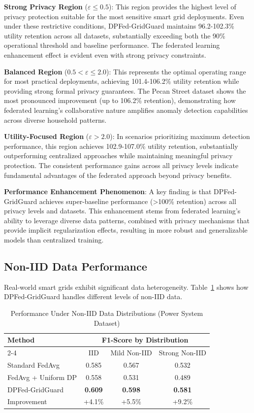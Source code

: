 \documentclass{ieeeaccess}
\theoremstyle{definition}
\begin{document}
\textbf{Strong Privacy Region} ($\varepsilon \leq 0.5$): This region provides the highest level of privacy protection suitable for the most sensitive smart grid deployments. Even under these restrictive conditions, DPFed-GridGuard maintains 96.2-102.3\% utility retention across all datasets, substantially exceeding both the 90\% operational threshold and baseline performance. The federated learning enhancement effect is evident even with strong privacy constraints.

\textbf{Balanced Region} ($0.5 < \varepsilon \leq 2.0$): This represents the optimal operating range for most practical deployments, achieving 101.4-106.2\% utility retention while providing strong formal privacy guarantees. The Pecan Street dataset shows the most pronounced improvement (up to 106.2\% retention), demonstrating how federated learning's collaborative nature amplifies anomaly detection capabilities across diverse household patterns.

\textbf{Utility-Focused Region} ($\varepsilon > 2.0$): In scenarios prioritizing maximum detection performance, this region achieves 102.9-107.0\% utility retention, substantially outperforming centralized approaches while maintaining meaningful privacy protection. The consistent performance gains across all privacy levels indicate fundamental advantages of the federated approach beyond privacy benefits.

\textbf{Performance Enhancement Phenomenon}: A key finding is that DPFed-GridGuard achieves super-baseline performance (>100\% retention) across all privacy levels and datasets. This enhancement stems from federated learning's ability to leverage diverse data patterns, combined with privacy mechanisms that provide implicit regularization effects, resulting in more robust and generalizable models than centralized training.

\subsection{Non-IID Data Performance}

Real-world smart grids exhibit significant data heterogeneity. Table~\ref{tab:noniid_performance} shows how DPFed-GridGuard handles different levels of non-IID data.

\begin{table}[htbp]
\caption{Performance Under Non-IID Data Distributions (Power System Dataset)}
\label{tab:noniid_performance}
\centering
\begin{tabular}{lccc}
\toprule
\multirow{2}{*}{Method} & \multicolumn{3}{c}{F1-Score by Distribution} \\
\cmidrule{2-4}
 & IID & Mild Non-IID & Strong Non-IID \\
\midrule
Standard FedAvg & 0.585 & 0.567 & 0.532 \\
FedAvg + Uniform DP & 0.558 & 0.531 & 0.489 \\
DPFed-GridGuard & \textbf{0.609} & \textbf{0.598} & \textbf{0.581} \\
\quad Improvement & +4.1\% & +5.5\% & +9.2\% \\
\bottomrule
\end{tabular}
\end{table}
\end{document}
